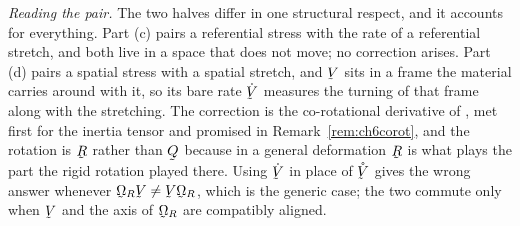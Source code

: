 \begin{solution}
\medskip
\noindent\emph{Reading the pair.}
The two halves differ in one structural respect, and it accounts for
everything. Part (c) pairs a referential stress with the rate of a
referential stretch, and both live in a space that does not move; no
correction arises. Part (d) pairs a spatial stress with a spatial
stretch, and $\bV$ sits in a frame the material carries around with it,
so its bare rate $\dot\bV$ measures the turning of that frame along
with the stretching. The correction is the co-rotational derivative of
, met first for the inertia tensor and promised in
Remark~\ref{rem:ch6corot}, and the rotation is $\bR$ rather than $\bQ$
because in a general deformation $\bR$ is what plays the part the rigid
rotation played there. Using $\dot\bV$ in place of $\mathring\bV$ gives
the wrong answer whenever $\bOm_{R}\bV\neq\bV\bOm_{R}$, which is the
generic case; the two commute only when $\bV$ and the axis of
$\bOm_{R}$ are compatibly aligned.
\end{solution}
